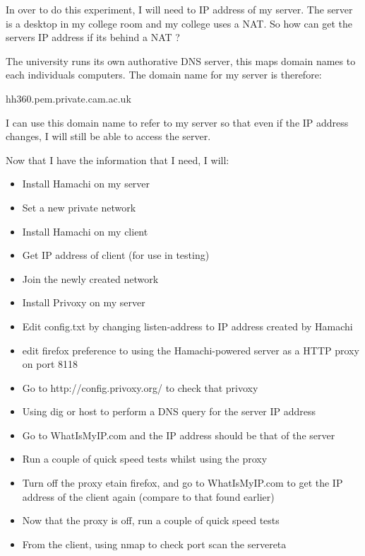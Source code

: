 \documentclass[12pt,a4paper,oneside]{article}
\begin{document}
In over to do this experiment, I will need to IP address of my server. The server is a desktop in my college room and my college uses a NAT. So how can get the servers IP address if its behind a NAT ?

The university runs its own authorative DNS server, this maps domain names to each individuals computers. The domain name for my server is therefore:

hh360.pem.private.cam.ac.uk

I can use this domain name to refer to my server so that even if the IP address changes, I will still be able to access the server.


Now that I have the information that I need, I will:
\begin{itemize}
\item Install Hamachi on my server
\item Set a new private network
\item Install Hamachi on my client
\item Get IP address of client (for use in testing)
\item Join the newly created network
\item Install Privoxy on my server
\item Edit config.txt by changing listen-address to IP address created by Hamachi
\item edit firefox preference to using the Hamachi-powered server as a HTTP proxy on port 8118
\item Go to http://config.privoxy.org/ to check that privoxy
\item Using dig or host to perform a DNS query for the server IP address
\item Go to WhatIsMyIP.com and the IP address should be that of the server
\item Run a couple of quick speed tests whilst using the proxy
\item Turn off the proxy etain firefox, and go to WhatIsMyIP.com to get the IP address of the client again (compare to that found earlier)
\item Now that the proxy is off, run a couple of quick speed tests 
\item From the client, using nmap to check port scan the servereta
\end{itemize}
\end{document}
